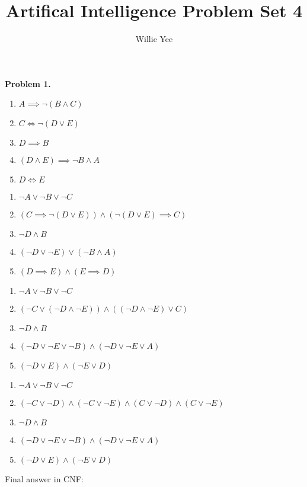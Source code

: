 \documentclass{article}
\begin{document}
\title{Artifical Intelligence Problem Set 4}
\date{}
\author{Willie Yee}
\maketitle
\noindent
\textbf{Problem 1.}
\begin{enumerate}
	\item $A\implies\neg(B\wedge C)$
	\item $C\iff\neg(D\vee E)$
	\item $D\implies B$
	\item $(D\wedge E)\implies\neg B\wedge A$
	\item $D\iff E$\\
\end{enumerate}
\begin{enumerate}
	\item $\neg A\vee\neg B\vee\neg C$
	\item $(C\implies\neg(D\vee E))\wedge(\neg(D\vee E)\implies C)$
	\item $\neg D\wedge B$
	\item $(\neg D\vee\neg E)\vee(\neg B\wedge A)$
	\item $(D\implies E)\wedge(E\implies D)$\\
\end{enumerate}
\begin{enumerate}
	\item $\neg A\vee\neg B\vee\neg C$
	\item $(\neg C\vee(\neg D\wedge\neg E))\wedge((\neg D\wedge\neg E)\vee C)$
	\item $\neg D\wedge B$
	\item $(\neg D\vee\neg E\vee\neg B)\wedge(\neg D\vee\neg E\vee A)$
	\item $(\neg D\vee E)\wedge(\neg E\vee D)$\\
\end{enumerate}
\begin{enumerate}
	\item $\neg A\vee\neg B\vee\neg C$
	\item $(\neg C\vee\neg D)\wedge(\neg C\vee\neg E)\wedge(C\vee\neg D)\wedge(C\vee\neg E)$
	\item $\neg D\wedge B$
	\item $(\neg D\vee\neg E\vee\neg B)\wedge(\neg D\vee\neg E\vee A)$
	\item $(\neg D\vee E)\wedge(\neg E\vee D)$\\
\end{enumerate}
Final answer in CNF:\\
\end{document}
